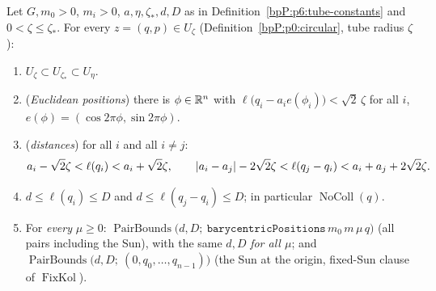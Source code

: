 \begin{lemma}\label{bpP:p6:tube-geometry}
Let $G,m_0>0$, $m_i>0$, $a,\eta,\zeta_*,d,D$ as in Definition~\ref{bpP:p6:tube-constants} and $0<\zeta\le\zeta_*$. For every $z=(q,p)\in U_\zeta$ (Definition~\ref{bpP:p0:circular}, tube radius $\zeta$):
\begin{enumerate}[label=(\alph*)]
\item $U_\zeta\subset U_{\zeta_*}\subset U_\eta$.
\item (\emph{Euclidean positions}) there is $\phi\in\mathbb{R}^n$ with $\ell\bigl(q_i-a_ie(\phi_i)\bigr)<\sqrt2\,\zeta$ for all $i$, $e(\phi)=(\cos2\pi\phi,\sin2\pi\phi)$.
\item (\emph{distances}) for all $i$ and all $i\ne j$:
\[a_i-\sqrt2\zeta<\ell(q_i)<a_i+\sqrt2\zeta,\qquad\lvert a_i-a_j\rvert-2\sqrt2\zeta<\ell(q_j-q_i)<a_i+a_j+2\sqrt2\zeta.\]
\item $d\le\ell(q_i)\le D$ and $d\le\ell(q_j-q_i)\le D$; in particular $\operatorname{NoColl}(q)$.
\item For \emph{every} $\mu\ge0$: $\operatorname{PairBounds}\bigl(d,D;\ \texttt{barycentricPositions}\,m_0\,m\,\mu\,q\bigr)$ (all pairs including the Sun), with the same $d,D$ \emph{for all $\mu$}; and $\operatorname{PairBounds}\bigl(d,D;\ (0,q_0,\dots,q_{n-1})\bigr)$ (the Sun at the origin, fixed-Sun clause of $\operatorname{FixKol}$).
\end{enumerate}
\end{lemma}
